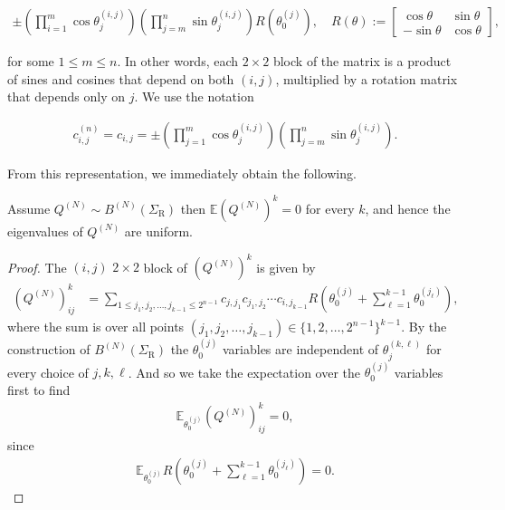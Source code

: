 \begin{align}
\pm \left(\prod_{i=1}^m \cos \theta_j^{(i,j)} \right) \left( \prod_{j=m}^{n} \sin \theta_j^{(i,j)}  \right) R(\theta_0^{(j)}), \quad R(\theta) := \begin{bmatrix}
\cos \theta & \sin \theta \\ - \sin \theta & \cos \theta
\end{bmatrix},
\end{align}

for some $1\leq m \leq n$.  In other words, each $2\times 2$ block of the matrix is a product of sines and cosines that depend on both $(i,j)$, multiplied by a rotation matrix that depends only on $j$.  We use the notation

\begin{align}\label{e:cij}
c^{(n)}_{i,j} = c_{i,j} = \pm \left(\prod_{j=1}^m \cos \theta_j^{(i,j)} \right) \left( \prod_{j=m}^{n} \sin \theta_j^{(i,j)}  \right).
\end{align}

From this representation, we immediately obtain the following.

\begin{lemma}
Assume $Q^{(N)} \sim B^{(N)}(\Sigma_{\mathrm{R}})$ then $\mathbb E ( Q^{(N)})^k = 0$ for every $k$, and hence the eigenvalues of $Q^{(N)}$ are uniform.
\end{lemma}

\begin{proof}
The $(i,j)$ $2 \times 2$ block of $( Q^{(N)})^k$ is given by
\begin{align}
( Q^{(N)})^k_{ij} &= \sum_{1 \leq j_1, j_2, \ldots, j_{k-1}\leq 2^{n-1}} c_{j,j_1} c_{j_1,j_2}\cdots c_{i,j_{k-1}} R\left(\theta_0^{(j)} + \sum_{\ell=1}^{k-1}\theta_0^{(j_\ell)}  \right),
\end{align}
where the sum is over all points $(j_1,j_2,\ldots,j_{k-1}) \in \{1,2,\ldots,2^{n-1}\}^{k-1}$.  By the construction of $B^{(N)}(\Sigma_{\mathrm{R}})$ the $\theta_0^{(j)}$ variables are independent of 
$\theta_j^{(k,\ell)}$ for every choice of $j,k,\ell$.  And so we take the expectation over the $\theta_0^{(j)}$ variables first to find
\begin{align}
\mathbb E_{\theta_0^{(j)}} ( Q^{(N)})^k_{ij} = 0,
\end{align}
since
\begin{align}
\mathbb E_{\theta_0^{(j)}} R\left(\theta_0^{(j)} + \sum_{\ell=1}^{k-1}\theta_0^{(j_\ell)}  \right) = 0.
\end{align}
\end{proof}

